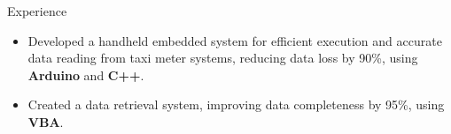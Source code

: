 \documentclass{resume} %
\begin{document}
\begin{workSection}{Experience}
    \experienceItem[
    company=Ministry of Transportation and Communications TW \& NCTU,
    location=Taipei{,} Taiwan,
    position=Embedded System engineer,
    duration=Jun 2016 – Sep 2016
    ]
    \vspace{-0.65em}
    \begin{itemize}
        \itemsep -6pt {}
        \item Developed a handheld embedded system for efficient execution and
              accurate data reading from taxi meter systems, reducing data loss
              by
              90\%, using \textbf{Arduino} and \textbf{C++}.
        \item Created a data retrieval system, improving data completeness by
              95\%,
              using \textbf{VBA}.
    \end{itemize}

\end{workSection}

\education{
\educationItem[
university=National Chiao Tung University (NCTU),
location=Hsinchu{,} Taiwan,
program=B.S.{,} Computer Science
]
}
\end{document}
